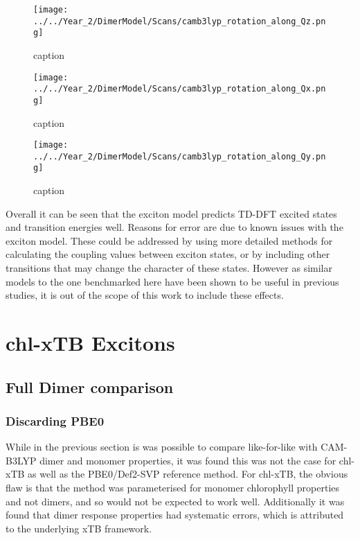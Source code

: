 \begin{figure}
    \centering
    \texttt{[image: ../../Year\_2/DimerModel/Scans/camb3lyp\_rotation\_along\_Qz.png]}
    \caption{caption}
\end{figure}

\begin{figure}
    \centering
    \texttt{[image: ../../Year\_2/DimerModel/Scans/camb3lyp\_rotation\_along\_Qx.png]}
    \caption{caption}
\end{figure}

\begin{figure}
    \centering
    \texttt{[image: ../../Year\_2/DimerModel/Scans/camb3lyp\_rotation\_along\_Qy.png]}
    \caption{caption}
\end{figure}

Overall it can be seen that the exciton model predicts TD-DFT excited states and
transition energies well. Reasons for error are due to known issues with the exciton
model. These could be addressed by using more detailed methods for calculating the
coupling values between exciton states, or by including other transitions that may
change the character of these states. However as similar models to the one benchmarked
here have been shown to be useful in previous studies, it is out of the scope of 
this work to include these effects.

\afterpartskip
\section{chl-xTB Excitons}
\label{sec:chl_xTB_excitons}

\subsection{Full Dimer comparison}
\label{subsec:pbe0_and_chl_xtb_dimer}

\subsubsection{Discarding PBE0}
\label{subsec:state_assign}

While in the previous section is was possible to compare like-for-like with CAM-B3LYP
dimer and monomer properties, it was found this was not the case for chl-xTB as 
well as the PBE0/Def2-SVP reference method. For chl-xTB, the obvious flaw is that
the method was parameterised for monomer chlorophyll properties and not dimers, 
and so would not be expected to work well. Additionally it was found that dimer
response properties had systematic errors, which is attributed to the underlying
xTB framework.

